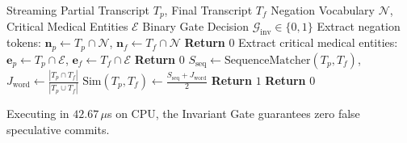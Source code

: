 \documentclass[10pt,journal,compsoc]{IEEEtran}
\begin{document}
\begin{algorithm}[!t]
\caption{Three-Stage Clinical Invariant Verification Gate ($\mathcal{G}_{\text{inv}}$)}
\label{alg:invariant_gate}
\footnotesize
\begin{algorithmic}[1]
\REQUIRE Streaming Partial Transcript $T_p$, Final Transcript $T_f$
\REQUIRE Negation Vocabulary $\mathcal{N}$, Critical Medical Entities $\mathcal{E}$
\ENSURE Binary Gate Decision $\mathcal{G}_{\text{inv}} \in \{0, 1\}$
\STATE Extract negation tokens: $\mathbf{n}_p \leftarrow T_p \cap \mathcal{N}$, $\mathbf{n}_f \leftarrow T_f \cap \mathcal{N}$
    \STATE \textbf{Return} $0$ 
\ENDIF
\STATE Extract critical medical entities: $\mathbf{e}_p \leftarrow T_p \cap \mathcal{E}$, $\mathbf{e}_f \leftarrow T_f \cap \mathcal{E}$
    \STATE \textbf{Return} $0$ 
\ENDIF
\STATE $S_{\text{seq}} \leftarrow \text{SequenceMatcher}(T_p, T_f)$, $J_{\text{word}} \leftarrow \frac{|T_p \cap T_f|}{|T_p \cup T_f|}$
\STATE $\text{Sim}(T_p, T_f) \leftarrow \frac{S_{\text{seq}} + J_{\text{word}}}{2}$
    \STATE \textbf{Return} $1$ 
\ELSE
    \STATE \textbf{Return} $0$ 
\ENDIF
\end{algorithmic}
\end{algorithm}

Executing in $42.67\,\mu$s on CPU, the Invariant Gate guarantees zero false speculative commits.
\end{document}
